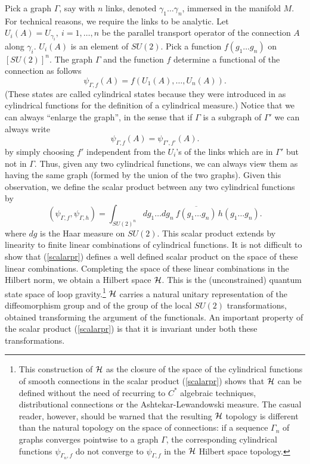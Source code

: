 Pick a graph $\Gamma$, say with $n$ links, denoted 
$\gamma_{1}\ldots\gamma_{n}$, immersed in the manifold $M$.  For 
technical reasons, we require the links to be analytic.  Let 
$U_{i}(A)=U_{\gamma_{i}}, \ i=1,\ldots, n$ be the parallel transport 
operator of the connection $A$ along $\gamma_{i}$.  $U_{i}(A)$ is an 
element of $SU(2)$.  Pick a function $f(g_{1}\ldots g_{n})$ on 
$[SU(2)]^{n}$.  The graph $\Gamma$ and the function $f$ determine a 
functional of the connection as follows
\begin{equation}
	\psi_{\Gamma,f}(A)=f(U_{1}(A),\ldots, U_{n}(A)). 
\end{equation}
(These states are called cylindrical states because they were 
introduced in 
\cite{AshtekarLewandowski,AshtekarLewandowski3,%
AshtekarLewandowski2} as cylindrical functions 
for the definition of a cylindrical measure.)  Notice that we can 
always ``enlarge the graph'', in the sense that if $\Gamma$ is a 
subgraph of $\Gamma'$ we can always write
\begin{equation}
	\psi_{\Gamma,f}(A)=	\psi_{\Gamma',f'}(A). 
	\label{prmap}
\end{equation}
by simply choosing $f'$ independent from the $U_{i}$'s of the 
links which are in $\Gamma'$ but not in $\Gamma$.  Thus, given 
any two cylindrical functions, we can always view them as having 
the same graph (formed by the union of the two graphs).  Given this 
observation, we define the scalar product between any two 
cylindrical functions
 \cite{JerzyGraph,AshtekarLewandowski,AshtekarLewandowski3,%
 AshtekarLewandowski2} by
\begin{equation}
	(\psi_{\Gamma,f}, \psi_{\Gamma,h}) = \int _{SU(2)^{n}} 
	\!\!\! dg_{1}\ldots dg_{n} \  
	\overline{f(g_{1}\ldots g_{n})}\, 
	h(g_{1}\ldots g_{n}).
\label{scalarpr}
\end{equation}
where $dg$ is the Haar measure on $SU(2)$.  This scalar product 
extends by linearity to finite linear combinations of cylindrical 
functions.  It is not difficult to show that (\ref{scalarpr}) 
defines a well defined scalar product on the space of these 
linear combinations.  Completing the space of these linear 
combinations in the Hilbert norm, we obtain a Hilbert space $\cal 
H$.  This is the (unconstrained) quantum state space of loop 
gravity.\footnote{This construction of $\cal H$ as the closure 
of the space of the cylindrical functions of smooth connections
in the scalar product (\ref{scalarpr}) shows that $\cal H$ can
be defined without the need of recurring to $C^{*}$ algebraic 
techniques, distributional connections or the Ashtekar-Lewandowski 
measure. The casual reader, however, should be warned that 
the resulting $\cal H$ topology is different than the natural 
topology on the space of connections: if a sequence $\Gamma_{n}$ of 
graphs converges pointwise to a graph $\Gamma$, the corresponding
cylindrical functions $\psi_{\Gamma_{n},f}$ do not converge to 
$\psi_{\Gamma,f}$ in the $\cal H$ Hilbert space topology.}
$\cal H$ carries a natural unitary representation of the 
diffeomorphism group and of the group of the local $SU(2)$ 
transformations, obtained transforming the argument of the 
functionals.  An important property of the scalar product 
(\ref{scalarpr}) is that it is invariant under both these 
transformations.


